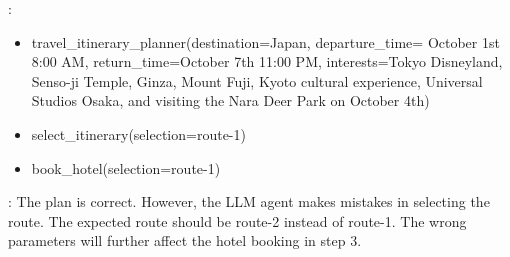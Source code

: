 :
\begin{itemize}
    \item travel\_itinerary\_planner(destination=Japan, departure\_time= October 1st 8:00 AM, return\_time=October 7th 11:00 PM, interests=Tokyo Disneyland, Senso-ji Temple, Ginza, Mount Fuji, Kyoto cultural experience, Universal Studios Osaka, and visiting the Nara Deer Park on October 4th)
    \item select\_itinerary(selection=route-1)
    \item book\_hotel(selection=route-1)
\end{itemize}

: The plan is correct. However, the LLM agent makes mistakes in selecting the route. The expected route should be route-2 instead of route-1. The wrong parameters will further affect the hotel booking in step 3.

